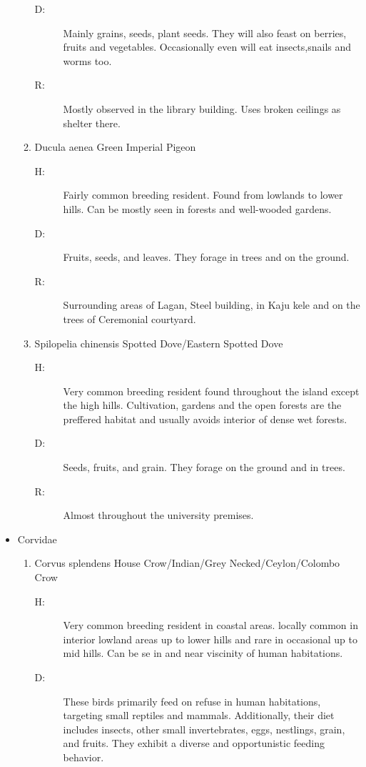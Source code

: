 \begin{itemize}
\begin{enumerate}
\begin{description}
\item[D: ]%
Mainly grains, seeds, plant seeds. They will also feast on berries, fruits and vegetables. Occasionally even will eat insects,snails and worms too.%
\item[R: ]%
Mostly observed in the library building. Uses broken ceilings as shelter there.%
\end{description}%
\item%
Ducula aenea\newline%
Green Imperial Pigeon%
\begin{description}%
\item[H: ]%
Fairly common breeding resident. Found from lowlands to lower hills. Can be mostly seen in forests and well{-}wooded gardens.%
\item[D: ]%
Fruits, seeds, and leaves. They forage in trees and on the ground.%
\item[R: ]%
Surrounding areas of Lagan, Steel building, in Kaju kele and on the trees of Ceremonial courtyard.%
\end{description}%
\item%
Spilopelia chinensis\newline%
Spotted Dove/Eastern Spotted Dove%
\begin{description}%
\item[H: ]%
Very common breeding resident found throughout the island except the high hills. Cultivation, gardens and the open forests are the preffered habitat and usually avoids interior of dense wet forests.%
\item[D: ]%
Seeds, fruits, and grain. They forage on the ground and in trees.%
\item[R: ]%
Almost throughout the university premises.%
\end{description}%
\end{enumerate}%
\item%
Corvidae%
\begin{enumerate}%
\item%
Corvus splendens\newline%
House Crow/Indian/Grey Necked/Ceylon/Colombo Crow%
\begin{description}%
\item[H: ]%
Very common breeding resident in coastal areas. locally common in interior lowland areas up to lower hills and rare in occasional up to mid hills. Can be se in and near viscinity of human habitations.%
\item[D: ]%
These birds primarily feed on refuse in human habitations, targeting small reptiles and mammals. Additionally, their diet includes insects, other small invertebrates, eggs, nestlings, grain, and fruits. They exhibit a diverse and opportunistic feeding behavior.%

\end{description}
\end{enumerate}
\end{itemize}
